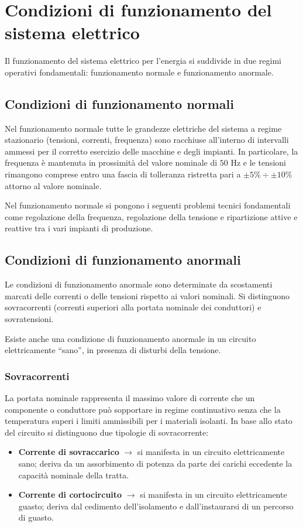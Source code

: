\section{Condizioni di funzionamento del sistema elettrico}
Il funzionamento del sistema elettrico per l'energia si suddivide in due regimi operativi fondamentali: funzionamento normale e funzionamento anormale.

\subsection{Condizioni di funzionamento normali}
Nel funzionamento normale tutte le grandezze elettriche del sistema a regime stazionario (tensioni, correnti, frequenza) sono racchiuse all'interno di intervalli ammessi per il corretto esercizio delle macchine e degli impianti. In particolare, la frequenza è mantenuta in prossimità del valore nominale di $50\text{ Hz}$ e le tensioni rimangono comprese entro una fascia di tolleranza ristretta pari a $\pm 5\% \div \pm 10\%$ attorno al valore nominale.

Nel funzionamento normale si pongono i seguenti problemi tecnici fondamentali come regolazione della frequenza, regolazione della tensione e ripartizione attive e reattive tra i vari impianti di produzione.

\subsection{Condizioni di funzionamento anormali}
Le condizioni di funzionamento anormale sono determinate da scostamenti marcati delle correnti o delle tensioni rispetto ai valori nominali. Si distinguono sovracorrenti (correnti superiori alla portata nominale dei conduttori) e sovratensioni.

Esiste anche una condizione di funzionamento anormale in un circuito elettricamente “sano”, in presenza di disturbi della tensione.

\subsubsection{Sovracorrenti}
La portata nominale rappresenta il massimo valore di corrente che un componente o conduttore può sopportare in regime continuativo senza che la temperatura superi i limiti ammissibili per i materiali isolanti. In base allo stato del circuito si distinguono due tipologie di sovracorrente:
\begin{itemize}
    \item \textbf{Corrente di sovraccarico} $\rightarrow$ si manifesta in un circuito elettricamente sano; deriva da un assorbimento di potenza da parte dei carichi eccedente la capacità nominale della tratta.
    \item \textbf{Corrente di cortocircuito} $\rightarrow$ si manifesta in un circuito elettricamente guasto; deriva dal cedimento dell'isolamento e dall'instaurarsi di un percorso di guasto.
\end{itemize}

